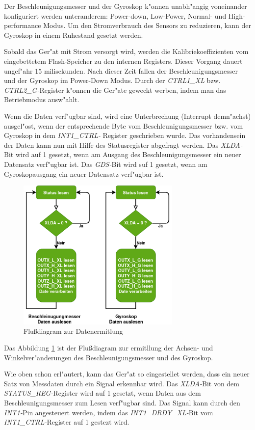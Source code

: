 Der Beschleunigungsmesser und der Gyroskop k"onnen unabh"angig voneinander konfiguriert werden unteranderem: Power-down, Low-Power, Normal- und High- performance Modus. Um den Stromverbrauch des Sensors zu reduzieren, kann der Gyroskop in einem Ruhestand gesetzt werden.


Sobald das Ger"at mit Strom versorgt wird, werden die Kalibriekoeffizienten vom eingebettetem Flash-Speicher zu den internen Registers. Dieser Vorgang dauert ungef"ahr 15 milisekunden. Nach dieser Zeit fallen der Beschleunigungsmesser und der Gyroskop im Power-Down Modus. Durch der \textit{CTRL1\_XL} bzw. \textit{CTRL2\_G-}Register k"onnen die Ger"ate geweckt werben, indem man das Betriebmodus ausw"ahlt.

Wenn die Daten verf"ugbar sind, wird eine Unterbrechung (Interrupt demn"achst) ausgel"ost, wenn der entsprechende Byte vom Beschleunigungsmesser bzw. vom Gyroskop in dem \textit{INT1\_CTRL-} Register geschrieben wurde. Das vorhandensein der Daten kann nun mit Hilfe des Statusregister abgefragt werden. Das \textit{XLDA-}Bit wird auf 1 gesetzt, wenn am Ausgang des Beschleunigungsmesser ein neuer Datensatz verf"ugbar ist. Das \textit{GDS-}Bit wird suf 1 gesetzt, wenn am Gyroskopausgang ein neuer Datensatz verf"ugbar ist.

\begin{figure}[h]
	\centering
	\includegraphics[width=8cm]{source/images/Gy_Acc_data}
	\caption{Flu\ss{}diagram zur Datenermitlung}\label{Gy_Acc_data}
\end{figure}

Das Abbildung \ref{Gy_Acc_data} ist der Flu\ss{}diagram zur ermitllung der Achsen- und Winkelver"anderungen des Beschleunigungsmesser und des Gyroskop.

Wie oben schon erl"autert, kann das Ger"at so eingestellet werden, dass ein neuer Satz von Messdaten durch ein Signal erkennbar wird. Das \textit{XLDA-}Bit von dem \textit{STATUS\_REG-}Register wird auf 1 gesetzt, wenn Daten aus dem Beschleunigungsmesser zum Lesen verf"ugbar sind. Das Signal kann durch den \textit{INT1-}Pin angesteuert werden, indem  das \textit{INT1\_DRDY\_XL-}Bit vom \textit{INT1\_CTRL-}Register auf 1 gestezt wird. 

